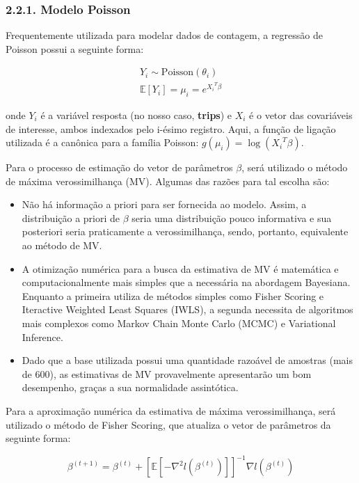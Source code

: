 \documentclass[
]{article}
\begin{document}
\subsubsection{2.2.1. Modelo Poisson}\label{modelo-poisson}

Frequentemente utilizada para modelar dados de contagem, a regressão de
Poisson possui a seguinte forma:

\[
\begin{array}{c}
Y_i \sim \text{Poisson}(\theta_i) \\
\mathbb{E}[Y_i] = \mu_i = e^{{X_i}^T\beta}
\end{array}
\]

onde \(Y_i\) é a variável resposta (no nosso caso, \textbf{trips}) e
\(X_i\) é o vetor das covariáveis de interesse, ambos indexados pelo
i-ésimo registro. Aqui, a função de ligação utilizada é a canônica para
a família Poisson: \(g(\mu_i) = \log({X_i}^T\beta)\).

Para o processo de estimação do vetor de parâmetros \(\beta\), será
utilizado o método de máxima verossimilhança (MV). Algumas das razões
para tal escolha são:

\begin{itemize}
\item
  Não há informação a priori para ser fornecida ao modelo. Assim, a
  distribuição a priori de \(\beta\) seria uma distribuição pouco
  informativa e sua posteriori seria praticamente a verossimilhança,
  sendo, portanto, equivalente ao método de MV.
\item
  A otimização numérica para a busca da estimativa de MV é matemática e
  computacionalmente mais simples que a necessária na abordagem
  Bayesiana. Enquanto a primeira utiliza de métodos simples como Fisher
  Scoring e Iteractive Weighted Least Squares (IWLS), a segunda
  necessita de algoritmos mais complexos como Markov Chain Monte Carlo
  (MCMC) e Variational Inference.
\item
  Dado que a base utilizada possui uma quantidade razoável de amostras
  (mais de 600), as estimativas de MV provavelmente apresentarão um bom
  desempenho, graças a sua normalidade assintótica.
\end{itemize}

Para a aproximação numérica da estimativa de máxima verossimilhança,
será utilizado o método de Fisher Scoring, que atualiza o vetor de
parâmetros da seguinte forma:

\[
\beta^{(t+1)} = \beta^{(t)} + [\mathbb{E}[-\nabla^2 l(\beta^{(t)})]]^{-1} \nabla l(\beta^{(t)})
\]
\end{document}
